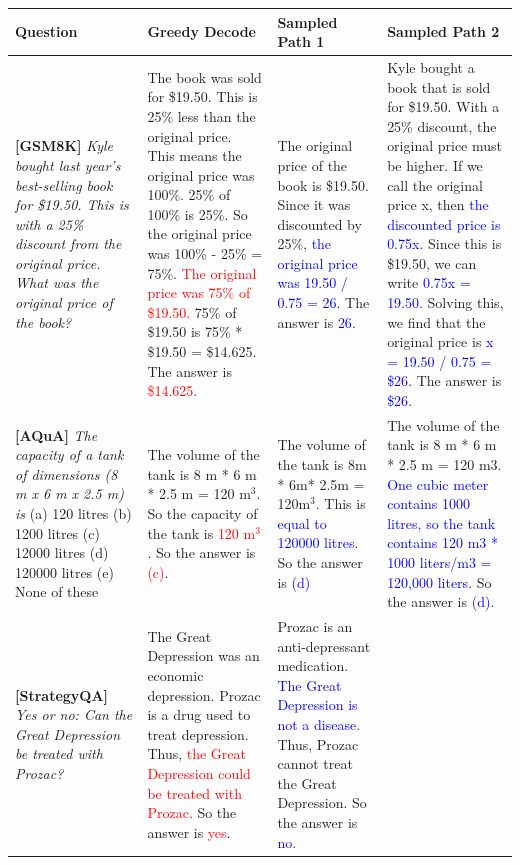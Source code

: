\begin{table}[h]
\setlength\tabcolsep{4pt}
\scriptsize
    \centering
    \begin{tabular}{p{3cm} | p{3.3cm} | p{3cm} | p{3.4cm} }
        Question & Greedy Decode & Sampled Path 1 & Sampled Path 2  \\
         \midrule
         \textbf{[GSM8K]} \textit{Kyle bought last year's best-selling book for \$19.50. This is with a 25\% discount from the original price. What was the original price of the book?} & The book was sold for \$19.50. This is 25\% less than the original price. This means the original price was 100\%. 25\% of 100\% is 25\%. So the original price was 100\% - 25\% = 75\%. \textcolor{red}{The original price was 75\% of \$19.50.} 75\% of \$19.50 is 75\% * \$19.50 = \$14.625. The answer is \textcolor{red}{\$14.625}. & The original price of the book is \$19.50. Since it was discounted by 25\%, \textcolor{blue}{the original price was 19.50 / 0.75 = 26}. The answer is \textcolor{blue}{26}. & Kyle bought a book that is sold for \$19.50. With a 25\% discount, the original price must be higher. If we call the original price x, then \textcolor{blue}{the discounted price is 0.75x}. Since this is \$19.50, we can write \textcolor{blue}{0.75x = 19.50}. Solving this, we find that the original price is \textcolor{blue}{x = 19.50 / 0.75 = \$26}. The answer is \textcolor{blue}{\$26}.\\
         \midrule
        \textbf{[AQuA]} \textit{The capacity of a tank of dimensions (8 m x 6 m x 2.5 m) is} (a) 120 litres (b) 1200 litres (c) 12000 litres (d) 120000 litres (e) None of these
         & The volume of the tank is 8 m * 6 m * 2.5 m = 120 m$^3$. So the capacity of the tank is \textcolor{red}{120 m$^3$}. So the answer is \textcolor{red}{(c)}.
         & The volume of the tank is 8m * 6m* 2.5m = 120m$^3$. This is \textcolor{blue}{equal to 120000 litres}. So the answer is \textcolor{blue}{(d)} 
         & 
         The volume of the tank is 8 m * 6 m * 2.5 m = 120 m3. \textcolor{blue}{One cubic meter contains 1000 litres, so the tank contains 120 m3 * 1000 liters/m3 = 120,000 liters}. So the answer is \textcolor{blue}{(d)}.\\
         \midrule
         \textbf{[StrategyQA]} \textit{Yes or no: Can the Great Depression be treated with Prozac?}
         & The Great Depression was an economic depression. Prozac is a drug used to treat depression. Thus, \textcolor{red}{the Great Depression could be treated with Prozac}. So the answer is \textcolor{red}{yes}.
         & Prozac is an anti-depressant medication. \textcolor{blue}{The Great Depression is not a disease}. Thus, Prozac cannot treat the Great Depression. So the answer is \textcolor{blue}{no}.

\end{tabular}
\end{table}
